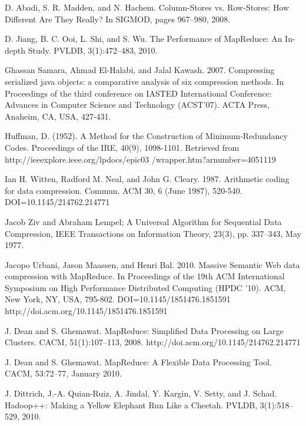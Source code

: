 \documentclass[twocolumn]{article}
\begin{document}
{\begin{thebibliography}{10}
 D. Abadi, S. R. Madden, and N. Hachem. Column-Stores
                vs. Row-Stores: How Different Are They Really? In
                SIGMOD, pages 967–980, 2008.

 D. Jiang, B. C. Ooi, L. Shi, and S. Wu. The Performance of
                MapReduce: An In-depth Study. PVLDB, 3(1):472–483,
                2010.

 Ghassan Samara, Ahmad El-Halabi, and Jalal Kawash. 2007. Compressing
                serialized java objects: a comparative analysis of six
                compression methods. In Proceedings of the third conference
                on IASTED International Conference: Advances in Computer
                Science and Technology (ACST'07). ACTA Press, Anaheim, CA,
                USA, 427-431.

 Huffman, D. (1952). A Method for the Construction of Minimum-Redundancy Codes.
		Proceedings of the IRE, 40(9), 1098-1101. Retrieved from
		http://ieeexplore.ieee.org/lpdocs/epic03 /wrapper.htm?arnumber=4051119

 Ian H. Witten, Radford M. Neal, and John G. Cleary. 1987.
                Arithmetic coding for data compression. Commun.
                ACM 30, 6 (June 1987), 520-540. DOI=10.1145/214762.214771

 Jacob Ziv and Abraham Lempel; A Universal Algorithm for Sequential
        	Data Compression, IEEE Transactions on Information Theory,
        	23(3), pp. 337–343, May 1977.

 Jacopo Urbani, Jason Maassen, and Henri Bal. 2010. Massive 
		Semantic Web data compression with MapReduce. In Proceedings of the 19th 
		ACM International Symposium on High Performance Distributed Computing 
		(HPDC '10). ACM, New York, NY, USA, 795-802. DOI=10.1145/1851476.1851591 
	       	http://doi.acm.org/10.1145/1851476.1851591	

 J. Dean and S. Ghemawat. MapReduce: Simplified Data
                Processing on Large Clusters. CACM, 51(1):107–113, 2008.
               http://doi.acm.org/10.1145/214762.214771

 J. Dean and S. Ghemawat. MapReduce: A Flexible Data
                Processing Tool. CACM, 53:72–77, January 2010.

 J. Dittrich, J.-A. Quian-Ruiz, A. Jindal, Y. Kargin,
                V. Setty, and J. Schad. Hadoop++: Making a Yellow
                Elephant Run Like a Cheetah. PVLDB, 3(1):518–529, 2010.\


\end{thebibliography}}
\end{document}
